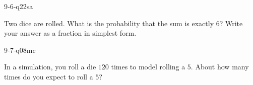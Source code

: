 \begin{practiceQuestion}{9-6-q22}{sa}
\begin{questionText}
Two dice are rolled. What is the probability that the sum is exactly $6$? Write your answer as a fraction in simplest form.
\end{questionText}
\end{practiceQuestion}

\begin{practiceQuestion}{9-7-q08}{mc}
\begin{questionText}
In a simulation, you roll a die $120$ times to model rolling a $5$. About how many times do you expect to roll a $5$?
\end{questionText}
\end{practiceQuestion}
